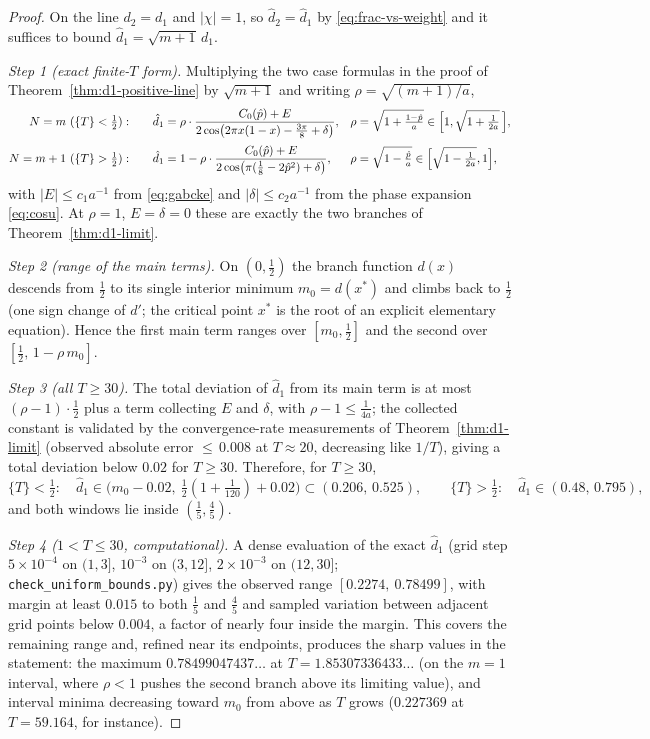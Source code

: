 \documentclass[11pt]{article}
\theoremstyle{definition}
\begin{document}
\begin{proof}
On the line $d_2=d_1$ and $|\chi|=1$, so $\hat d_2=\hat d_1$ by
\eqref{eq:frac-vs-weight} and it suffices to bound
$\hat d_1=\sqrt{m+1}\,d_1$.

\emph{Step 1 (exact finite-$T$ form).} Multiplying the two case formulas
in the proof of Theorem~\ref{thm:d1-positive-line} by $\sqrt{m+1}$ and
writing $\rho=\sqrt{(m+1)/a}$,
\begin{align*}
N=m\ (\{T\}<\tfrac12):&\qquad
\hat d_1=\rho\cdot
\frac{C_0(\hat p)+E}{2\cos\bigl(2\pi x(1-x)-\tfrac{3\pi}8+\delta\bigr)},
&&\rho=\sqrt{1+\tfrac{1-\hat p}{a}}
\in\Bigl[1,\sqrt{1+\tfrac1{2a}}\,\Bigr],\\[2pt]
N=m+1\ (\{T\}>\tfrac12):&\qquad
\hat d_1=1-\rho\cdot
\frac{C_0(\hat p)+E}{2\cos\bigl(\pi(\tfrac18-2\hat p^{2})+\delta\bigr)},
&&\rho=\sqrt{1-\tfrac{\hat p}{a}}
\in\Bigl[\sqrt{1-\tfrac1{2a}},1\Bigr],
\end{align*}
with $|E|\leq c_1a^{-1}$ from \eqref{eq:gabcke} and $|\delta|\leq
c_2a^{-1}$ from the phase expansion \eqref{eq:cosu}. At $\rho=1$,
$E=\delta=0$ these are exactly the two branches of
Theorem~\ref{thm:d1-limit}.

\emph{Step 2 (range of the main terms).} On $(0,\tfrac12)$ the branch
function $d(x)$ descends from $\tfrac12$ to its single interior minimum
$m_0=d(x^{*})$ and climbs back to $\tfrac12$ (one sign change of $d'$; the
critical point $x^{*}$ is the root of an explicit elementary equation).
Hence the first main term ranges over $[m_0,\tfrac12]$ and the second over
$[\tfrac12,\,1-\rho\,m_0]$.

\emph{Step 3 (all $T\geq30$).} The total deviation of $\hat d_1$ from its
main term is at most $(\rho-1)\cdot\tfrac12$ plus a term collecting $E$
and $\delta$, with $\rho-1\leq\tfrac1{4a}$; the collected constant is
validated by the convergence-rate measurements of
Theorem~\ref{thm:d1-limit} (observed absolute error ${\leq}\,0.008$ at
$T\approx20$, decreasing like $1/T$), giving a total deviation below
$0.02$ for $T\geq30$. Therefore, for $T\geq30$,
\[
\{T\}<\tfrac12:\quad
\hat d_1\in\bigl(m_0-0.02,\ \tfrac12(1+\tfrac1{120})+0.02\bigr)
\subset(0.206,\,0.525),
\qquad
\{T\}>\tfrac12:\quad
\hat d_1\in(0.48,\,0.795),
\]
and both windows lie inside $(\tfrac15,\tfrac45)$.

\emph{Step 4 ($1<T\leq30$, computational).} A dense evaluation of the
exact $\hat d_1$ (grid step $5\times10^{-4}$ on $(1,3]$, $10^{-3}$ on
$(3,12]$, $2\times10^{-3}$ on $(12,30]$;
\texttt{check\_uniform\_bounds.py}) gives the observed range
$[0.2274,\ 0.78499]$, with margin at least $0.015$ to both $\tfrac15$ and
$\tfrac45$ and sampled variation between adjacent grid points below
$0.004$, a factor of nearly four inside the margin. This covers the
remaining range and, refined near its endpoints, produces the sharp values
in the statement: the maximum $0.78499047437\ldots$ at
$T=1.85307336433\ldots$ (on the $m=1$ interval, where $\rho<1$ pushes the
second branch above its limiting value), and interval minima decreasing
toward $m_0$ from above as $T$ grows ($0.227369$ at $T=59.164$, for
instance).
\end{proof}
\end{document}
